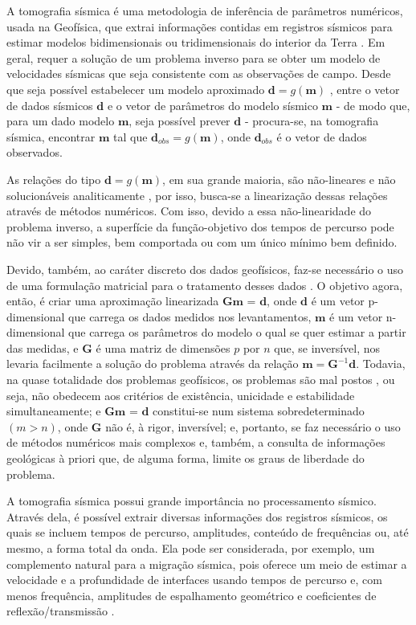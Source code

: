 \documentclass[a4paper, 12 pt]{article} %
\begin{document}
A tomografia sísmica é uma metodologia de inferência de parâmetros numéricos, usada na Geofísica, que extrai informações contidas em registros sísmicos para estimar modelos bidimensionais ou tridimensionais do interior da Terra \citep{rawlinson2010seismic}. Em geral, requer a solução de um problema inverso para se obter um modelo de velocidades sísmicas que seja consistente com as observações de campo. Desde que seja possível estabelecer um modelo aproximado $\textbf{d} = g(\textbf{m})$ , entre o vetor de dados sísmicos $\textbf{d}$ e o vetor de parâmetros do modelo sísmico $\textbf{m}$ - de modo que, para um dado modelo $\textbf{m}$, seja possível prever $\textbf{d}$ - procura-se, na tomografia sísmica, encontrar $\textbf{m}$ tal que $\textbf{d}_{obs} = g(\textbf{m})$, onde $\textbf{d}_{obs}$ é o vetor de dados observados.

As relações do tipo $\textbf{d} = g(\textbf{m})$, em sua grande maioria, são não-lineares e não solucionáveis analiticamente \citep{reis2015aplicaccao}, por isso, busca-se a linearização dessas relações através de
métodos numéricos. Com isso, devido a essa não-linearidade do problema inverso, a superfície da função-objetivo dos tempos de percurso pode não vir a ser simples, bem comportada ou com um único mínimo bem definido. 

Devido, também, ao caráter discreto dos dados geofísicos, faz-se necessário o uso de uma formulação matricial para o tratamento desses dados \citep{reis2015aplicaccao}. O objetivo agora, então, é criar uma aproximação linearizada $\textbf{Gm = d}$, onde $\textbf{d}$ é um vetor p-dimensional que carrega os dados medidos nos levantamentos, $\textbf{m}$ é um vetor n-dimensional que carrega os parâmetros do modelo o qual se quer estimar a partir das medidas, e $\textbf{G}$ é uma matriz de dimensões $\textit{p}$ por $\textit{n}$ que, se inversível, nos levaria facilmente a solução do problema através da relação $\textbf{m} = \textbf{G}^{-1}\textbf{d}$. Todavia, na quase totalidade dos problemas geofísicos, os problemas são
mal postos \citep{reis2015aplicaccao}, ou seja, não obedecem aos critérios de existência, unicidade e estabilidade simultaneamente; e $\textbf{Gm = d}$ constitui-se num sistema sobredeterminado $(\textit{m} > \textit{n})$, onde $\textbf{G}$ não é, à rigor, inversível; e, portanto, se faz necessário o uso de métodos numéricos mais complexos e, também, a consulta de informações geológicas à priori que, de alguma forma, limite os graus de liberdade do problema.

A tomografia sísmica possui grande importância no processamento sísmico. Através dela, é possível extrair diversas informações dos registros sísmicos, os quais se incluem tempos de percurso, amplitudes, conteúdo de frequências ou, até mesmo, a forma total da onda. Ela pode ser considerada, por exemplo, um complemento natural para a migração sísmica, pois oferece um meio de estimar a velocidade e a profundidade de interfaces usando tempos de percurso e, com menos frequência, amplitudes de espalhamento geométrico e coeficientes de reflexão/transmissão \citep{reis2015aplicaccao}.
\end{document}
